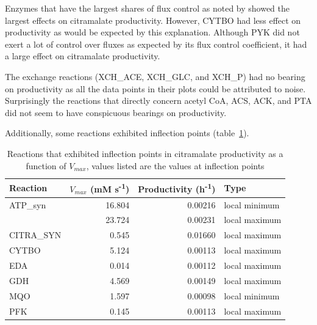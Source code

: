 \documentclass[parskip=full, numbers=noenddot]{scrreprt}
\begin{document}
Enzymes that have the largest shares of flux control as noted by \citet{millard_metabolic_2017} showed the largest effects on citramalate productivity. However, CYTBO had less effect on productivity as would be expected by this explanation. Although PYK did not exert a lot of control over fluxes as expected by its flux control coefficient, it had a large effect on citramalate productivity. %

The exchange reactions (XCH\_ACE, XCH\_GLC, and XCH\_P) had no bearing on productivity as all the data points in their plots could be attributed to noise. Surprisingly the reactions that directly concern acetyl CoA, ACS, ACK, and PTA did not seem to have conspicuous bearings on productivity.

Additionally, some reactions exhibited inflection points (table~\ref{tab:inflection}).

\begin{table}[h]
  \caption{Reactions that exhibited inflection points in citramalate productivity as a function of $V_{max}$, values listed are the values at inflection points}
  \label{tab:inflection}
  \centering
  \begin{tabular}{lrrl}
    \toprule
    Reaction & $V_{max}$ (mM s\textsuperscript{-1}) & Productivity (h\textsuperscript{-1}) & Type\\
    \midrule
    ATP\_syn & 16.804 & 0.00216 & local minimum\\
    & 23.724 & 0.00231 & local maximum\\
    CITRA\_SYN & 0.545 & 0.01660 & local maximum\\
    CYTBO & 5.124 & 0.00113 & local maximum\\
    EDA & 0.014 & 0.00112 & local maximum\\
    GDH & 4.569 & 0.00149 & local maximum\\
    MQO & 1.597 & 0.00098 & local minimum\\
    PFK & 0.145 & 0.00113 & local maximum\\
    \bottomrule
  \end{tabular}
\end{table}

\end{document}
